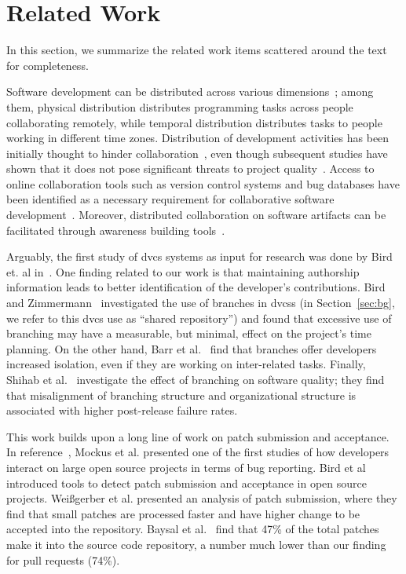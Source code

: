 \documentclass{acm_proc_article-sp}
\begin{document}
\section{Related Work}

In this section, we summarize the related work items scattered around
the text for completeness.

Software development can be distributed across various
di\-men\-sions~\cite{Gumm06}; among them, physical distribution distributes
programming tasks across people collaborating remotely, while temporal
distribution distributes tasks to people working in different time zones.
Distribution of development activities has been initially thought to hinder
collaboration~\cite{Herbs99, Batti01}, even though subsequent studies have
shown that it does not pose significant threats to project
quality~\cite{Spine06, Nguye08, Bird09a}. Access to online collaboration tools
such as version control systems and bug databases have been identified as a necessary
requirement for collaborative software development~\cite{Knuds76,Pilat06,
Catal06}. Moreover, distributed collaboration on software artifacts can be
facilitated through awareness building tools~\cite{Dabbi12, Treud12, Lanza10}. 

Arguably, the first study of {\sc dvcs} systems as input for research was done
by Bird et. al in~\cite{Bird09}. One finding related to our work is that
maintaining authorship information leads to better identification of the
developer's contributions. Bird and Zimmermann~\cite{Bird12} investigated the
use of branches in {\sc dvcs}s (in Section~\ref{sec:bg}, we refer to this {\sc
dvcs} use as ``shared repository'') and found that excessive use of branching
may have a measurable, but minimal, effect on the project's time planning.
On the other hand, Barr et al.~\cite{Barr12} find that branches offer developers
increased isolation, even if they are working on inter-related tasks.
Finally, Shihab et al.~\cite{Shiha12} investigate the effect of branching on
software quality; they find that misalignment of branching structure and organizational structure is associated with higher post-release failure rates.

This work builds upon a long line of work on patch submission and acceptance.
In reference~\cite{MOCKU02}, Mockus et al. presented one of the first studies of
how developers interact on large open source projects in terms of bug reporting.
Bird et al~\cite{Bird07a} introduced tools to detect patch submission and
acceptance in open source projects. Wei\ss gerber et al. presented an analysis
of patch submission, where they find that small patches are processed faster and
have higher change to be accepted into the repository. Baysal et
al.~\cite{Baysa12} find that 47\% of the total patches make it into the source
code repository, a number much lower than our finding for pull requests (74\%).
\end{document}
